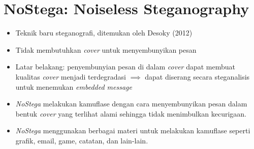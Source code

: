 \documentclass{article}
\begin{document}

\section*{NoStega: Noiseless Steganography}

\begin{itemize}
    \item Teknik baru steganografi, ditemukan oleh Desoky (2012)
    \item Tidak membutuhkan \textit{cover} untuk menyembunyikan pesan
    \item Latar belakang: penyembunyian pesan di dalam \textit{cover} dapat membuat kualitas \textit{cover} menjadi terdegradasi $\implies$ dapat diserang secara steganalisis untuk menemukan \textit{embedded message}

    \item \textit{NoStega} melakukan kamuflase dengan cara menyembunyikan pesan dalam bentuk \textit{cover} yang terlihat alami sehingga tidak menimbulkan kecurigaan.

    \item \textit{NoStega} menggunakan berbagai materi untuk melakukan kamuflase seperti grafik, email, game, catatan, dan lain-lain.
\end{itemize}
\end{document}
